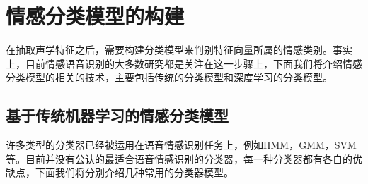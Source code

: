 \section{情感分类模型的构建}
\label{sec:emotion_cls}

在抽取声学特征之后，需要构建分类模型来判别特征向量所属的情感类别。事实上，目前情感语音识别的大多数研究都是关注在这一步骤上，下面我们将介绍情感分类模型的相关的技术，主要包括传统的分类模型和深度学习的分类模型。

\subsection{基于传统机器学习的情感分类模型}
\label{ssec:traditional_cls}

许多类型的分类器已经被运用在语音情感识别任务上，例如HMM，GMM，SVM等。目前并没有公认的最适合语音情感识别的分类器，每一种分类器都有各自的优缺点，下面我们将分别介绍几种常用的分类器模型。

